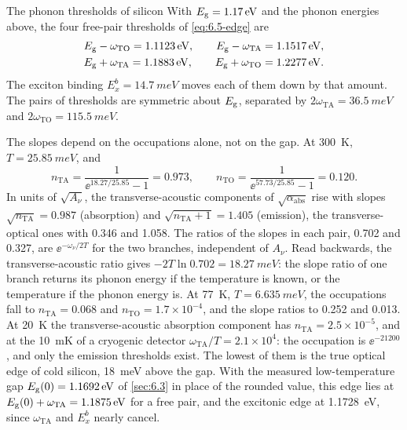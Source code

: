 \begin{workedexample}{The phonon thresholds of silicon}\label{we:6-siedge}
With $E_{\mathrm{g}} = \SI{1.17}{eV}$ and the phonon energies above, the four free-pair thresholds of \cref{eq:6.5-edge} are
\begin{equation*}
  \begin{gathered}
  E_{\mathrm{g}} - \omega_{\mathrm{TO}} = \SI{1.1123}{eV}, \qquad
  E_{\mathrm{g}} - \omega_{\mathrm{TA}} = \SI{1.1517}{eV}, \\
  E_{\mathrm{g}} + \omega_{\mathrm{TA}} = \SI{1.1883}{eV}, \qquad
  E_{\mathrm{g}} + \omega_{\mathrm{TO}} = \SI{1.2277}{eV} .
  \end{gathered}
\end{equation*}
The exciton binding $E_x^b = \SI{14.7}{meV}$ moves each of them down by that amount. The pairs of thresholds are symmetric about $E_{\mathrm{g}}$, separated by $2\omega_{\mathrm{TA}} = \SI{36.5}{meV}$ and $2\omega_{\mathrm{TO}} = \SI{115.5}{meV}$.

The slopes depend on the occupations alone, not on the gap. At \SI{300}{K}, $T = \SI{25.85}{meV}$, and
\begin{equation*}
  n_{\mathrm{TA}} = \frac{1}{\ee^{18.27/25.85} - 1} = 0.973, \qquad n_{\mathrm{TO}} = \frac{1}{\ee^{57.73/25.85} - 1} = 0.120 .
\end{equation*}
In units of $\sqrt{A_\nu}$, the transverse-acoustic components of $\sqrt{\alpha_{\mathrm{abs}}}$ rise with slopes $\sqrt{n_{\mathrm{TA}}} = 0.987$ (absorption) and $\sqrt{n_{\mathrm{TA}} + 1} = 1.405$ (emission), the transverse-optical ones with 0.346 and 1.058. The ratios of the slopes in each pair, 0.702 and 0.327, are $\ee^{-\omega_\nu/2T}$ for the two branches, independent of $A_\nu$. Read backwards, the transverse-acoustic ratio gives $-2T\ln 0.702 = \SI{18.27}{meV}$: the slope ratio of one branch returns its phonon energy if the temperature is known, or the temperature if the phonon energy is. At \SI{77}{K}, $T = \SI{6.635}{meV}$, the occupations fall to $n_{\mathrm{TA}} = 0.068$ and $n_{\mathrm{TO}} = 1.7\times10^{-4}$, and the slope ratios to 0.252 and 0.013. At \SI{20}{K} the transverse-acoustic absorption component has $n_{\mathrm{TA}} = 2.5\times10^{-5}$, and at the \SI{10}{mK} of a cryogenic detector $\omega_{\mathrm{TA}}/T = 2.1\times10^4$: the occupation is $\ee^{-21200}$, and only the emission thresholds exist. The lowest of them is the true optical edge of cold silicon, \SI{18}{meV} above the gap. With the measured low-temperature gap $E_{\mathrm{g}}(0) = \SI{1.1692}{eV}$ of \cref{sec:6.3} in place of the rounded value, this edge lies at $E_{\mathrm{g}}(0) + \omega_{\mathrm{TA}} = \SI{1.1875}{eV}$ for a free pair, and the excitonic edge at \SI{1.1728}{eV}, since $\omega_{\mathrm{TA}}$ and $E_x^b$ nearly cancel.
\end{workedexample}


